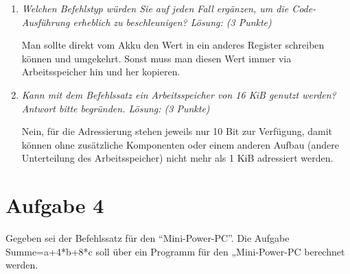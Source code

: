 \documentclass[10pt]{article}
\begin{document}
\begin{enumerate}[label=\alph*)]
	\item
		\textit{Welchen Befehlstyp würden Sie auf jeden Fall ergänzen, um die Code-Ausführung erheblich zu beschleunigen? Lösung: (3 Punkte)}
		
		Man sollte direkt vom Akku den Wert in ein anderes Register schreiben können und umgekehrt. Sonst muss man diesen Wert immer via Arbeitsspeicher hin und her kopieren.
		
	\item
		\textit{Kann mit dem Befehlssatz ein Arbeitsspeicher von 16 KiB genutzt werden? Antwort bitte begründen. Lösung: (3 Punkte)}
		
		Nein, für die Adressierung stehen jeweils nur 10 Bit zur Verfügung, damit können ohne zusätzliche Komponenten oder einem anderen Aufbau (andere Unterteilung des Arbeitsspeicher) nicht mehr als 1 KiB adressiert werden.
			
\end{enumerate}

\newpage

\section*{Aufgabe 4}
Gegeben sei der Befehlssatz für den "`Mini-Power-PC"'. Die Aufgabe Summe=a+4*b+8*c soll über ein Programm für den „Mini-Power-PC berechnet werden.
\end{document}
